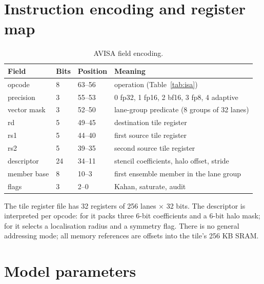 \FloatBarrier
\appendix
\section{Instruction encoding and register map}\label{app:isa}

\begin{table}[h]
\centering\small
\caption{AVISA field encoding.}
\begin{tabular}{@{}llll@{}}
\toprule
Field & Bits & Position & Meaning\\
\midrule
opcode & 8 & 63--56 & operation (Table~\ref{tab:isa})\\
precision & 3 & 55--53 & 0 fp32, 1 fp16, 2 bf16, 3 fp8, 4 adaptive\\
vector mask & 3 & 52--50 & lane-group predicate (8 groups of 32 lanes)\\
rd & 5 & 49--45 & destination tile register\\
rs1 & 5 & 44--40 & first source tile register\\
rs2 & 5 & 39--35 & second source tile register\\
descriptor & 24 & 34--11 & stencil coefficients, halo offset, stride\\
member base & 8 & 10--3 & first ensemble member in the lane group\\
flags & 3 & 2--0 & Kahan, saturate, audit\\
\bottomrule
\end{tabular}
\end{table}

The tile register file has 32 registers of 256 lanes $\times$ 32 bits. The descriptor is interpreted
per opcode: for  it packs three 6-bit coefficients and a 6-bit halo mask; for
 it selects a localisation radius and a symmetry flag. There is no general addressing
mode; all memory references are offsets into the tile's 256 KB SRAM.

\section{Model parameters}\label{app:params}

